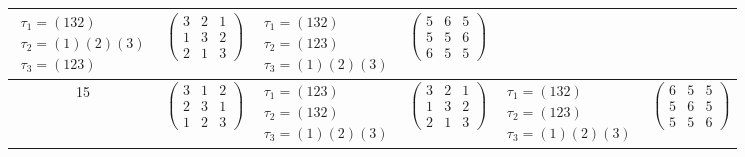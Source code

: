 \begin{longtable}{|c|p{2.7cm}|p{2.5cm}|p{2.7cm}|p{2.5cm}|p{2.7cm}|}
    $\begin{array}{l}\tau_1=(132)\\ \tau_2=(1)(2)(3)\\ \tau_3=(123)\end{array}$ &
    $\begin{pmatrix}3&2&1\\1&3&2\\2&1&3\end{pmatrix}$                           &
    $\begin{array}{l}\tau_1=(132)\\ \tau_2=(123)\\ \tau_3=(1)(2)(3)\end{array}$ &
    $\begin{pmatrix}5&6&5\\5&5&6\\6&5&5\end{pmatrix}$                                                                                                       \\
    \hline
    15                                                                          &
    $\begin{pmatrix}3&1&2\\2&3&1\\1&2&3\end{pmatrix}$                           &
    $\begin{array}{l}\tau_1=(123)\\ \tau_2=(132)\\ \tau_3=(1)(2)(3)\end{array}$ &
    $\begin{pmatrix}3&2&1\\1&3&2\\2&1&3\end{pmatrix}$                           &
    $\begin{array}{l}\tau_1=(132)\\ \tau_2=(123)\\ \tau_3=(1)(2)(3)\end{array}$ &
    $\begin{pmatrix}6&5&5\\5&6&5\\5&5&6\end{pmatrix}$                                                                                                       \\
    \hline
\end{longtable}
\endgroup

